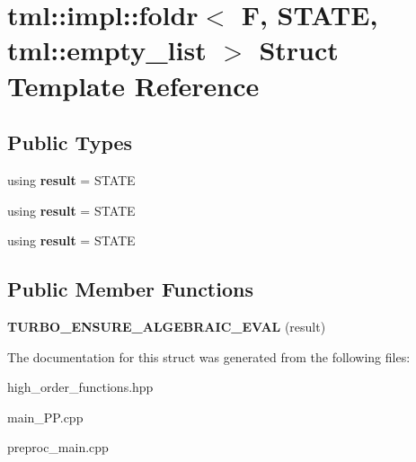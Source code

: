 \hypertarget{structtml_1_1impl_1_1foldr_3_01F_00_01STATE_00_01tml_1_1empty__list_01_4}{\section{tml\+:\+:impl\+:\+:foldr$<$ F, S\+T\+A\+T\+E, tml\+:\+:empty\+\_\+list $>$ Struct Template Reference}
\label{structtml_1_1impl_1_1foldr_3_01F_00_01STATE_00_01tml_1_1empty__list_01_4}
}
\subsection*{Public Types}
\begin{DoxyCompactItemize}
\item 
\hypertarget{structtml_1_1impl_1_1foldr_3_01F_00_01STATE_00_01tml_1_1empty__list_01_4_a477f6c3f7c80a88f0e3364f638577504}{using {\bfseries result} = S\+T\+A\+T\+E}\label{structtml_1_1impl_1_1foldr_3_01F_00_01STATE_00_01tml_1_1empty__list_01_4_a477f6c3f7c80a88f0e3364f638577504}

\item 
\hypertarget{structtml_1_1impl_1_1foldr_3_01F_00_01STATE_00_01tml_1_1empty__list_01_4_a477f6c3f7c80a88f0e3364f638577504}{using {\bfseries result} = S\+T\+A\+T\+E}\label{structtml_1_1impl_1_1foldr_3_01F_00_01STATE_00_01tml_1_1empty__list_01_4_a477f6c3f7c80a88f0e3364f638577504}

\item 
\hypertarget{structtml_1_1impl_1_1foldr_3_01F_00_01STATE_00_01tml_1_1empty__list_01_4_a477f6c3f7c80a88f0e3364f638577504}{using {\bfseries result} = S\+T\+A\+T\+E}\label{structtml_1_1impl_1_1foldr_3_01F_00_01STATE_00_01tml_1_1empty__list_01_4_a477f6c3f7c80a88f0e3364f638577504}

\end{DoxyCompactItemize}
\subsection*{Public Member Functions}
\begin{DoxyCompactItemize}
\item 
\hypertarget{structtml_1_1impl_1_1foldr_3_01F_00_01STATE_00_01tml_1_1empty__list_01_4_a656440516bbcf75ebfe43c4f731a06cf}{{\bfseries T\+U\+R\+B\+O\+\_\+\+E\+N\+S\+U\+R\+E\+\_\+\+A\+L\+G\+E\+B\+R\+A\+I\+C\+\_\+\+E\+V\+A\+L} (result)}\label{structtml_1_1impl_1_1foldr_3_01F_00_01STATE_00_01tml_1_1empty__list_01_4_a656440516bbcf75ebfe43c4f731a06cf}

\end{DoxyCompactItemize}


The documentation for this struct was generated from the following files\+:\begin{DoxyCompactItemize}
\item 
high\+\_\+order\+\_\+functions.\+hpp\item 
main\+\_\+\+P\+P.\+cpp\item 
preproc\+\_\+main.\+cpp\end{DoxyCompactItemize}
